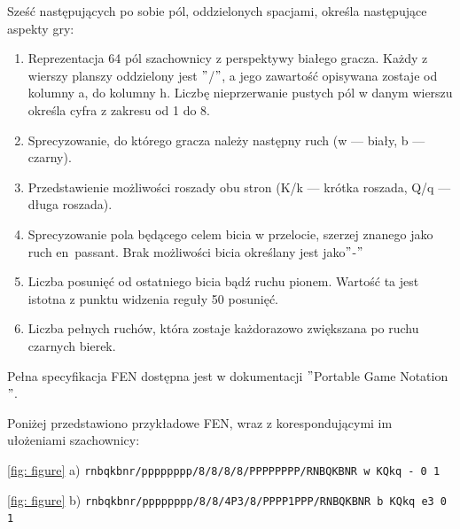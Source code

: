 Sześć następujących po sobie pól, oddzielonych spacjami, określa następujące aspekty gry:
\begin{enumerate}
    \item Reprezentacja 64 pól szachownicy z perspektywy białego gracza.
    Każdy z wierszy planszy oddzielony jest \("\)/\("\), a jego zawartość opisywana zostaje od kolumny a, do kolumny h.
    Liczbę nieprzerwanie pustych pól w danym wierszu określa cyfra z zakresu od 1 do 8.
    \item Sprecyzowanie, do którego gracza należy następny ruch (w — biały, b — czarny).
    \item Przedstawienie możliwości roszady obu stron (K/k — krótka roszada, Q/q — długa roszada).
    \item Sprecyzowanie pola będącego celem bicia w przelocie, szerzej znanego jako ruch en~passant.
    Brak możliwości bicia określany jest jako\("\)-\("\)
    \item Liczba posunięć od ostatniego bicia bądź ruchu pionem.
    Wartość ta jest istotna z punktu widzenia reguły 50 posunięć.
    \item Liczba pełnych ruchów, która zostaje każdorazowo zwiększana po ruchu czarnych bierek.
\end{enumerate}

Pełna specyfikacja FEN dostępna jest w dokumentacji \("\)Portable Game Notation\("\). \cite*{PGNdoc}

Poniżej przedstawiono przykładowe FEN, wraz z korespondującymi im ułożeniami szachownicy:

\vspace{5mm}
\centerline{
    \ref{fig: figure} a) \lstset{basicstyle=\ttfamily}\lstinline{rnbqkbnr/pppppppp/8/8/8/8/PPPPPPPP/RNBQKBNR w KQkq - 0 1}
}
\centerline{
    \ref{fig: figure} b) \lstset{basicstyle=\ttfamily}\lstinline{rnbqkbnr/pppppppp/8/8/4P3/8/PPPP1PPP/RNBQKBNR b KQkq e3 0 1}
}
\vspace{5mm}


